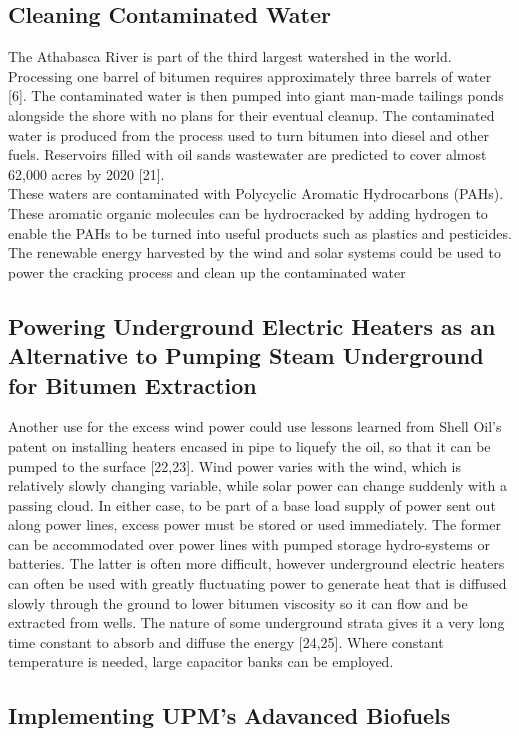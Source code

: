 \documentclass[12pt]{article}
\begin{document}
\subsection{Cleaning Contaminated Water}
The Athabasca River is part of the third largest watershed in the world. Processing one barrel of bitumen requires approximately three barrels of water [6]. The contaminated water is then pumped into giant man-made tailings ponds alongside the shore with no plans for their eventual cleanup.  The contaminated water is produced from the process used to turn bitumen into diesel and other fuels. Reservoirs filled with oil sands wastewater are predicted to cover almost 62,000 acres by 2020 [21]. \\

These waters are contaminated with Polycyclic Aromatic Hydrocarbons (PAHs). These aromatic organic molecules can be hydrocracked by adding hydrogen to enable the PAHs to be turned into useful products such as plastics and pesticides. The renewable energy harvested by the wind and solar systems could be used to power the cracking process and clean up the contaminated water

\subsection{Powering Underground Electric Heaters as an Alternative to Pumping Steam Underground for Bitumen Extraction}

Another use for the excess wind power could use lessons learned from Shell Oil’s patent on installing heaters encased in pipe to liquefy the oil, so that it can be pumped to the surface [22,23]. Wind power varies with the wind, which is relatively slowly changing variable, while solar power can change suddenly with a passing cloud. In either case, to be part of a base load supply of power sent out along power lines, excess power must be stored or used immediately. The former can be accommodated over power lines with pumped storage hydro-systems or batteries. The latter is often more difficult, however underground electric heaters can often be used with greatly fluctuating power to generate heat that is diffused slowly through the ground to lower bitumen viscosity so it can flow and be extracted from wells. The nature of some underground strata gives it a very long time constant to absorb and diffuse the energy [24,25]. Where constant temperature is needed, large capacitor banks can be employed.

\subsection{Implementing UPM's Adavanced Biofuels}
\end{document}
